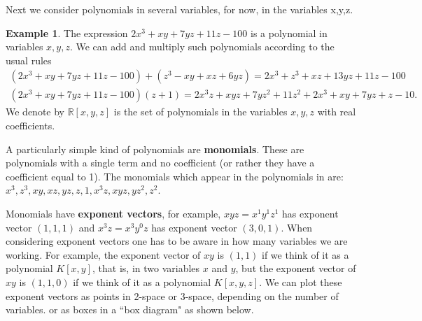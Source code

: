 \documentclass[11pt]{amsart}
\newcommand{\R}{{\mathbb R}}
\theoremstyle{plain} %
\theoremstyle{definition}
\newtheorem{ex}[thm]{Example}
\theoremstyle{remark}
\numberwithin{equation}{section}  %
\begin{document}
\smallskip

Next we consider polynomials in several variables, for now, in the variables x,y,z. 

\begin{ex}\label{ex: x y z}
The expression $2x^3+xy+7yz+11z-100$ is a polynomial in variables $x,y,z$. 
We can add and multiply such polynomials according to the usual rules
 \begin{eqnarray*}
 (2x^3+xy+7yz+11z-100) +(z^3-xy +xz+6yz)=2x^3+z^3+xz+13yz+11z-100\\
 (2x^3+xy+7yz+11z-100)(z+1)=2x^3z+xyz+7yz^2+11z^2+2x^3+xy+7yz+z-10.
\end{eqnarray*}
We denote by $\R[x,y,z]$ is the set of polynomials in the variables $x,y,z$ with real coefficients.
\end{ex}

A particularly simple kind of polynomials are {\bf monomials}. These are polynomials with a single term and no coefficient (or rather they have a coefficient equal to 1). The monomials which appear in the polynomials in  are: $x^3,z^3, xy, xz,yz,z, 1, x^3z, xyz, yz^2, z^2$. 

Monomials have {\bf exponent vectors}, for example, $xyz=x^1y^1z^1$ has exponent vector $(1,1,1)$ and $x^3z=x^3y^0z$ has exponent vector $(3,0,1)$. When considering exponent vectors one has to be aware in how many variables we are working. For example, the exponent vector of $xy$ is $(1,1)$ if we think of it as a polynomial $K[x,y]$, that is, in two variables $x$ and $y$, but  the exponent vector of $xy$ is $(1,1,0)$ if we think of it as a polynomial $K[x,y,z]$. We can plot these exponent vectors as points in 2-space or 3-space, depending on the number of variables. or as boxes in a ``box diagram" as shown below.
\end{document}
